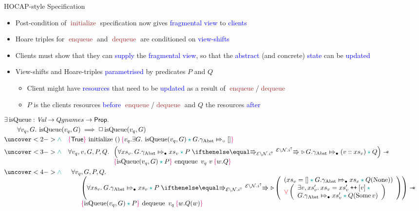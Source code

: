 \documentclass[9pt,xcolor={dvipsnames}]{beamer}
\newcommand{\initialise}{\operatorname{initialize}}
\newcommand{\enqueue}{\operatorname{enqueue}}
\newcommand{\dequeue}{\operatorname{dequeue}}
\newcommand{\isqueue}{\operatorname{isQueue}}
\newcommand{\Qgnames}{Qgnames}
\newcommand{\vq}{v_q}
\newcommand{\nodeval}{\valB}
\newcommand{\absvalue}{\val}
\newcommand{\absvalueList}{xs_v}
\newcommand{\Qg}{G}
\newcommand{\gabst}{\gname_{\mathrm{Abst}}}
\newcommand\catenate{\mathbin{\text{\ttfamily\upshape ++}}}
\newcommand{\Nl}{\ensuremath{\mathcal{N}}}
\newcommand{\abstractstatefullfrag}[2]{#1 \Mapsto_{\circ} #2}
\newcommand{\abstractstateauth}[2]{#1 \Mapsto_{\bullet} #2}
\newcommand{\hocapspecinitHTGen}[2]{\hoare{\TRUE}{\initialise \ \TT}{#1 . \Exists #2 . \isqueue(#1, #2) \star{} \abstractstatefullfrag{#2.\gabst}{[]}}}
\newcommand{\hocapspecinitGen}[2]{\hocapspecinitHTGen{#1}{#2}}
\newcommand{\hocapspecinit}{\hocapspecinitGen{\vq}{\Qg}}
\newcommand{\hocapspecenqVS}[5]{\abstractstateauth{#2.\gabst}{#5} \star{} #3 \vs[\mask\setminus\Nl.i^\uparrow] \later \abstractstateauth{#2.\gabst}{(#1 :: #5)} \star{} #4}
\newcommand{\hocapspecenqHT}[5]{\hoare{\isqueue(#1, #3) \star{} #4}{\enqueue \ #1 \ #2}{\valB . #5}}
\newcommand{\hocapspecenqGen}[6]{\All #1, #2, #3, #4, #5.
\begin{array}[t]{l}
\left(\All #6 . \hocapspecenqVS{#2}{#3}{#4}{#5}{#6} \right)
\wand\\
\hocapspecenqHT{#1}{#2}{#3}{#4}{#5}
\end{array}}
\newcommand{\hocapspecenq}{\hocapspecenqGen{\vq}{\absvalue}{\Qg}{P}{Q}{\absvalueList}}
\newcommand{\hocapspecdeqVSGen}[6]{
  \abstractstateauth{#1.\gabst}{#4} \star{} #2 \vs[\mask\setminus\Nl.i^\uparrow] \later
  \left(
    \begin{array}{l}
      (#4 = [] \star{} \abstractstateauth{#1.\gabst}{#4} \star{} #3(\None))\\
      \lor{}
      \left(
        \begin{array}{l}
          \Exists #5, #6 . #4 = #6 \catenate [#5] \star{}\\
          \abstractstateauth{#1.\gabst}{#6} \star{} #3(\Some{#5})
        \end{array}
        \right)
    \end{array}
  \right)
}
\newcommand{\hocapspecdeqVS}[4]{\hocapspecdeqVSGen{#1}{#2}{#3}{#4}{\absvalue}{#4'}}
\newcommand{\hocapspecdeqHT}[4]{\hoare{\isqueue(#1, #2) \star{} #3}{\dequeue \ #1}{\nodeval . #4(\nodeval)}}
\newcommand{\hocapspecdeqGen}[5]{\begin{array}[t]{l}
  \All #1, #2, #3, #4.\\
  \begin{array}[t]{l}
  \quad\left(\All #5 . \hocapspecdeqVS{#2}{#3}{#4}{#5} \right) \wand\\
  \quad\hocapspecdeqHT{#1}{#2}{#3}{#4}
  \end{array}
\end{array}}
\newcommand{\hocapspecdeq}{\hocapspecdeqGen{\vq}{\Qg}{P}{Q}{\absvalueList}}
\let\oldlor\lor
\renewcommand{\lor}{\begingroup \color{red} \oldlor \endgroup}
\let\oldland\land
\renewcommand{\land}{\begingroup \color{Emerald} \oldland \endgroup}
\let\oldstar\star
\renewcommand{\star}{\begingroup \color{Emerald} \oldstar \endgroup}
\begin{document}
\begin{frame}{HOCAP-style Specification}
  \begin{itemize}
    \item Post-condition of \textcolor{Brown}{$\initialise$} specification now gives \textcolor{blue}{fragmental view} to \textcolor{blue}{clients}
    \item Hoare triples for \textcolor{Brown}{$\enqueue$} and \textcolor{Brown}{$\dequeue$} are conditioned on \textcolor{blue}{view-shifts}
    \item Clients must show that they can \textcolor{blue}{supply} the \textcolor{blue}{fragmental view}, so that the \textcolor{blue}{abstract} (and concrete) \textcolor{blue}{state} can be \textcolor{blue}{updated}
    \item View-shifts and Hoare-triples \textcolor{blue}{parametrised} by predicates \textcolor{RubineRed}{$P$} and \textcolor{RubineRed}{$Q$}
      \begin{itemize}
        \item Client might have \textcolor{blue}{resources} that need to be \textcolor{blue}{updated} as a result of \textcolor{Brown}{$\enqueue$}/\textcolor{Brown}{$\dequeue$}
        \item \textcolor{RubineRed}{$P$} is the clients resources \textcolor{blue}{before} \textcolor{Brown}{$\enqueue$}/\textcolor{Brown}{$\dequeue$} and \textcolor{RubineRed}{$Q$} the resources \textcolor{blue}{after}
      \end{itemize}
  \end{itemize}
  \vspace{-4pt}
  \begin{definition}\label{QueueSpecs:spec:hocap}
    \setlength\abovedisplayskip{-8pt}
    \setlength\belowdisplayskip{2pt}
    \fontsize{7pt}{9}\selectfont
    \begin{align*}
      &\Exists \isqueue : \Val \to \Qgnames \to \Prop.\\
      &\quad\quad \All \vq, \Qg . \isqueue(\vq, \Qg) \implies \persistently \isqueue(\vq, \Qg)\\
      &\uncover<2->{\land{}\quad\hocapspecinit}\\
      &\uncover<3->{\land{}\quad\hocapspecenq}\\
      &\uncover<4->{\land{}\quad\hocapspecdeq}
    \end{align*}
  \end{definition}
\end{frame}
\end{document}
